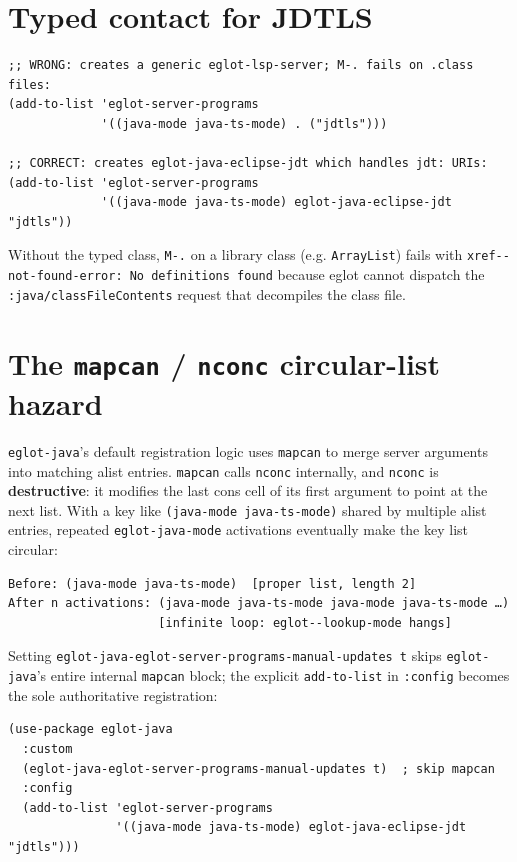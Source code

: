 \section{Typed contact for JDTLS}\label{typed-contact-for-jdtls}

\begin{verbatim}
;; WRONG: creates a generic eglot-lsp-server; M-. fails on .class files:
(add-to-list 'eglot-server-programs
             '((java-mode java-ts-mode) . ("jdtls")))

;; CORRECT: creates eglot-java-eclipse-jdt which handles jdt: URIs:
(add-to-list 'eglot-server-programs
             '((java-mode java-ts-mode) eglot-java-eclipse-jdt "jdtls"))
\end{verbatim}

Without the typed class, \texttt{M-.} on a library class (e.g. \texttt{ArrayList}) fails with \texttt{xref-\/-not-found-error: No definitions found} because eglot cannot dispatch the \texttt{:java/classFileContents} request that decompiles the class file.

\section{The \texttt{mapcan} / \texttt{nconc} circular-list hazard}\label{the-mapcan-nconc-circular-list-hazard}

\texttt{eglot-java}'s default registration logic uses \texttt{mapcan} to merge server arguments into matching alist entries. \texttt{mapcan} calls \texttt{nconc} internally, and \texttt{nconc} is \textbf{destructive}: it modifies the last cons cell of its first argument to point at the next list. With a key like \texttt{(java-mode java-ts-mode)} shared by multiple alist entries, repeated \texttt{eglot-java-mode} activations eventually make the key list circular:

\begin{verbatim}
Before: (java-mode java-ts-mode)  [proper list, length 2]
After n activations: (java-mode java-ts-mode java-mode java-ts-mode …)
                     [infinite loop: eglot--lookup-mode hangs]
\end{verbatim}

Setting \texttt{eglot-java-eglot-server-programs-manual-updates t} skips \texttt{eglot-java}'s entire internal \texttt{mapcan} block; the explicit \texttt{add-to-list} in \texttt{:config} becomes the sole authoritative registration:

\begin{verbatim}
(use-package eglot-java
  :custom
  (eglot-java-eglot-server-programs-manual-updates t)  ; skip mapcan
  :config
  (add-to-list 'eglot-server-programs
               '((java-mode java-ts-mode) eglot-java-eclipse-jdt "jdtls")))
\end{verbatim}

